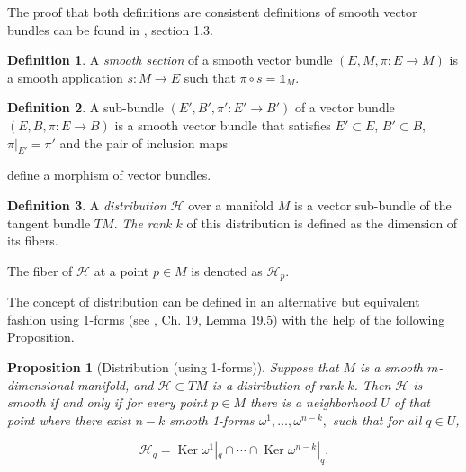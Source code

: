 \documentclass[12pt, letterpaper, reqno]{amsart}
\theoremstyle{definition}
\newtheorem{df}{Definition}
\theoremstyle{plain}
\newtheorem{prop}{Proposition}
\theoremstyle{remark}
\begin{document}
The proof that both definitions are consistent definitions of smooth vector bundles can be found in \cite{luke2013vector}, section 1.3.
\begin{df}
	A \textit{smooth section} of a smooth vector bundle $ (E,M,\pi:E \rightarrow {M}) $ is a smooth application $ s: M \rightarrow {E} $ such that $ \pi\circ s= \mathbb{1}_{M}. $    
\end{df}
\begin{df}
A sub-bundle $ (E',B',\pi':E' \rightarrow {B'}) $ of a vector bundle $  (E,B,\pi:E \rightarrow {B})  $   is a smooth vector bundle that satisfies $ E'\subset E $, $ B'\subset B $, $ \pi|_{E'}=\pi' $ and the pair of inclusion maps 
\begin{center}
\end{center}
define a morphism of vector bundles.
\end{df}
\begin{df}
	
	A \textit{distribution} $ \mathcal{H} $ over a manifold $ M $  is a vector sub-bundle of the tangent bundle $ TM $. \textit{ The rank $ k $}  of this distribution is defined as the dimension of its fibers.

	The fiber of $ \mathcal{H} $ at a point $ p\in M $ is denoted as $ \mathcal{H}_p. $ 
\end{df}

The concept of distribution can be defined in an alternative but equivalent  fashion using 1-forms (see \cite{lee2003introduction}, Ch. 19, Lemma 19.5) with the help of the following Proposition.

\begin{prop}[Distribution (using 1-forms)]
	Suppose that $ M $ is a smooth $ m $-dimensional manifold, and $ \mathcal{H} \subset TM$ is a distribution of rank $k$. Then $ \mathcal{H} $ is smooth if and only if for every point $ p\in M $ there is a neighborhood $ U $ of that point where there exist $n-k$ smooth 1-forms $ \omega^1,\dots,\omega^{n-k}, $ such that for all $ q\in U $,

	$$ \mathcal{H}_q = \operatorname{Ker} \omega^1|_q\cap \cdots \cap\operatorname{Ker} \omega^{n-k}|_q.  $$ 
\end{prop}
\end{document}

